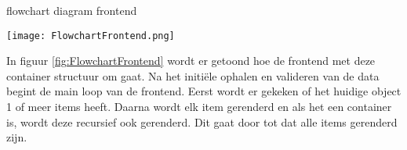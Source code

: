 \whitespace
\begin{graphic}
    \captionsetup{type=figure}
    \caption{flowchart diagram frontend}
    \texttt{[image: FlowchartFrontend.png]}
    \label{fig:FlowchartFrontend}
\end{graphic}

\whitespace
In figuur \ref{fig:FlowchartFrontend} wordt er getoond hoe de frontend met deze container structuur om gaat.
Na het initiële ophalen en valideren van de data begint de main loop van de frontend.
Eerst wordt er gekeken of het huidige object 1 of meer items heeft.
Daarna wordt elk item gerenderd en als het een container is, wordt deze recursief ook gerenderd.
Dit gaat door tot dat alle items gerenderd zijn.

